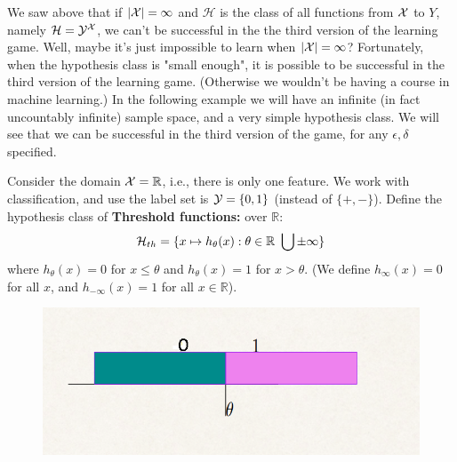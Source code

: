 \documentclass[11pt]{article}
\newcommand{\Hc}{\mathcal{H}}
\begin{document}


We saw above that if $|\mathcal{X}|=\infty$ and $\Hc$ is the class of all functions from
$\mathcal{X}$ to $Y$, namely $\Hc=\Y^\X$, we can't be successful in the  the third version of the learning game. 
Well, maybe it's just impossible to learn when $|\mathcal{X}|=\infty$?  Fortunately, when the hypothesis class is "small enough", it is possible to be successful in the third version of the learning game. (Otherwise we wouldn't be having a course in machine learning.) In the following example we will have an infinite (in fact uncountably infinite) sample space, and a very simple hypothesis class. We will see that we can be successful in the third version of the game, for any $\epsilon,\delta$ specified. 

Consider the domain $\mathcal{X}=\mathbb{R}$, i.e., there is only one feature. We work with classification, and use the label set is $\mathcal{Y}=\{0,1\}$ (instead of $\{+,-\}$).
Define the hypothesis class of \textbf{Threshold functions:}  over $\mathbb{R}$:
$$\Hc_{th} = \{ x \mapsto h_{\theta}(x) : \theta \in \reals\ \bigcup \pm\infty\}$$
where $ h_{\theta}(x)=0$ for $x\leq \theta$ and $ h_{\theta}(x)=1$ for $x> \theta$. (We define $h_{\infty}(x)=0$ for all $x$, and $h_{-\infty}(x)=1$ for all $x\in\mathbb{R}$).

\begin{figure}[h!]
  \centering
    \includegraphics[scale=0.3]{threshold.png}
\end{figure}
\vspace{5mm}
\end{document}
